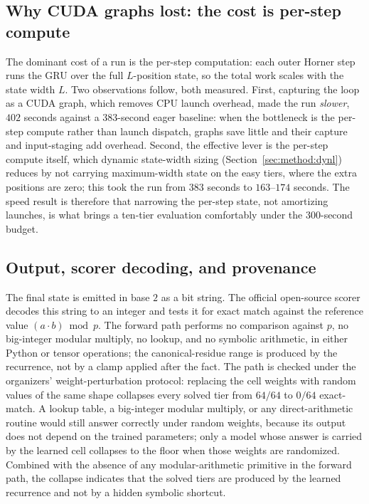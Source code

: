 \documentclass[11pt]{article}
\begin{document}
\subsection{Why CUDA graphs lost: the cost is per-step compute}
\label{sec:method:speed}

The dominant cost of a run is the per-step computation: each outer Horner step runs
the GRU over the full $L$-position state, so the total work scales with the state
width $L$. Two observations follow, both measured. First, capturing the loop as a
CUDA graph, which removes CPU launch overhead, made the run \emph{slower}, $402$
seconds against a $383$-second eager baseline: when the bottleneck is the per-step
compute rather than launch dispatch, graphs save little and their capture and
input-staging add overhead. Second, the effective lever is the per-step compute
itself, which dynamic state-width sizing (Section~\ref{sec:method:dynl}) reduces by
not carrying maximum-width state on the easy tiers, where the extra positions are
zero; this took the run from $383$ seconds to $163$--$174$ seconds. The speed result
is therefore that narrowing the per-step state, not amortizing launches, is what
brings a ten-tier evaluation comfortably under the $300$-second budget.

\subsection{Output, scorer decoding, and provenance}
\label{sec:method:output}

The final state is emitted in base $2$ as a bit string. The official open-source
scorer decodes this string to an integer and tests it for exact match against the
reference value $(a \cdot b) \bmod p$. The forward path performs no comparison
against $p$, no big-integer modular multiply, no lookup, and no symbolic
arithmetic, in either Python or tensor operations; the canonical-residue range is
produced by the recurrence, not by a clamp applied after the fact. The path is
checked under the organizers' weight-perturbation protocol: replacing the cell
weights with random values of the same shape collapses every solved tier from
$64/64$ to $0/64$ exact-match. A lookup table, a big-integer modular multiply, or
any direct-arithmetic routine would still answer correctly under random weights,
because its output does not depend on the trained parameters; only a model whose
answer is carried by the learned cell collapses to the floor when those weights are
randomized. Combined with the absence of any modular-arithmetic primitive in the
forward path, the collapse indicates that the solved tiers are produced by the
learned recurrence and not by a hidden symbolic shortcut.
\end{document}
